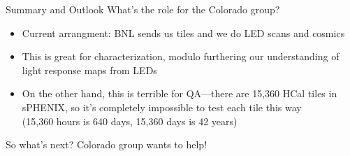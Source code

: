 \documentclass[compress,8pt]{beamer} %
\begin{document}
\begin{frame}{Summary and Outlook}
What's the role for the Colorado group?
\begin{itemize}
\item Current arrangment: BNL sends us tiles and we do LED scans and cosmics
\item This is great for characterization, modulo furthering our understanding
of light response maps from LEDs
\item On the other hand, this is terrible for QA---there are 15,360 HCal tiles in sPHENIX,
so it's completely
impossible to test each tile this way \\
(15,360 hours is 640 days, 15,360 days is 42 years)
\end{itemize}
So what's next?  Colorado group wants to help!
\end{frame}








\end{document}
